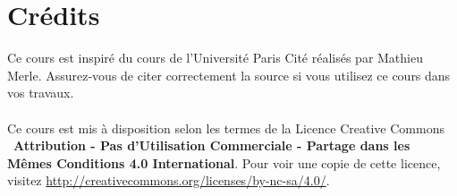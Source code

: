 \documentclass{article}
\begin{document}
\newpage
\tableofcontents
\section*{Crédits}
Ce cours est inspiré du cours de l'Université Paris Cité réalisés par Mathieu Merle. Assurez-vous de citer correctement la source si vous utilisez ce cours dans vos travaux.\\\\
Ce cours est mis à disposition selon les termes de la Licence Creative Commons \ccbyncsa\ \textbf{Attribution - Pas d'Utilisation Commerciale - Partage dans les Mêmes Conditions 4.0 International}. 
Pour voir une copie de cette licence, visitez \url{http://creativecommons.org/licenses/by-nc-sa/4.0/}.
\end{document}
